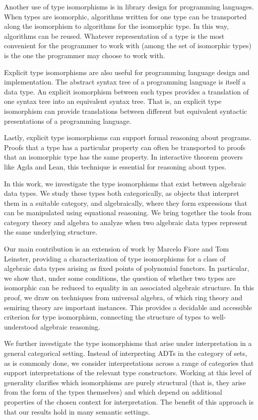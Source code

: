 \documentclass{msthesis}
\theoremstyle{definition}
\begin{document}
Another use of type isomorphisms is in library design for programming languages.  When types are isomorphic, algorithms written for one type can be transported along the isomorphism to algorithms for the isomorphic type.  In this way, algorithms can be reused.  Whatever representation of a type is the most convenient for the programmer to work with (among the set of isomorphic types) is the one the programmer may choose to work with.  

Explicit type isomorphisms are also useful for programming language design and implementation.  The abstract syntax tree of a programming language is itself a data type.  An explicit isomorphism between such types provides a translation of one syntax tree into an equivalent syntax tree.  That is, an explicit type isomorphism can provide translations between different but equivalent syntactic presentations of a programming language.

Lastly, explicit type isomorphisms can support formal reasoning about programs.  Proofs that a type has a particular property can often be transported to proofs that an isomorphic type has the same property.  In interactive theorem provers like Agda and Lean, this technique is essential for reasoning about types.  

In this work, we investigate the type isomorphisms that exist between algebraic data types.  We study these types both categorically, as objects that interpret them in a suitable category, and algebraically, where they form expressions that can be manipulated using equational reasoning.  We bring together the tools from category theory and algebra to analyze when two algebraic data types represent the same underlying structure.  

Our main contribution is an extension of work by Marcelo Fiore and Tom Leinster, providing a characterization of type isomorphisms for a class of algebraic data types arising as fixed points of polynomial functors. In particular, we show that, under some conditions, the question of whether two types are isomorphic can be reduced to equality in an associated algebraic structure.  In this proof, we draw on techniques from universal algebra, of which ring theory and semiring theory are important instances.  This provides a decidable and accessible criterion for type isomorphism, connecting the structure of types to well-understood algebraic reasoning.

We further investigate the type isomorphisms that arise under interpretation in a general categorical setting.  Instead of interpreting ADTs in the category of sets, as is commonly done, we consider interpretations across a range of categories that support interpretations of the relevant type constructors.  Working at this level of generality clarifies which isomorphisms are purely structural (that is, they arise from the form of the types themselves) and which depend on additional properties of the chosen context for interpretation.  The benefit of this approach is that our results hold in many semantic settings.
\end{document}
